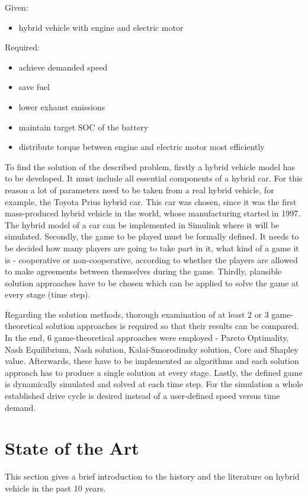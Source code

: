 Given:
\begin{itemize}
\item hybrid vehicle with engine and electric motor
\end{itemize}

Required: 
\begin{itemize}
\item achieve demanded speed
\item save fuel
\item lower exhaust emissions
\item maintain target SOC of the battery
\item distribute torque between engine and electric motor most efficiently
\end{itemize}

To find the solution of the described problem, firstly a hybrid vehicle model has to be developed. It must include all essential components of a hybrid car. For this reason a lot of parameters need to be taken from a real hybrid vehicle, for example, the Toyota Prius hybrid car. This car was chosen, since it was the first mass-produced hybrid vehicle in the world, whose manufacturing started in 1997. The hybrid model of a car can be implemented in Simulink where it will be simulated. Secondly, the game to be played must be formally defined. It needs to be decided how many players are going to take part in it, what kind of a game it is - cooperative or non-cooperative, according to whether the players are allowed to make agreements between themselves during the game. Thirdly, plausible solution approaches have to be chosen which can be applied to solve the game at every stage (time step). 

Regarding the solution methods, thorough examination of at least 2 or 3 game-theoretical solution approaches is required so that their results can be compared. In the end, 6 game-theoretical approaches were employed - Pareto Optimality, Nash Equilibrium, Nash solution, Kalai-Smorodinsky solution, Core and Shapley value. Afterwards, these have to be implemented as algorithms and each solution approach has to produce a single solution at every stage. Lastly, the defined game is dynamically simulated and solved at each time step. For the simulation a whole established drive cycle is desired instead of a user-defined speed versus time demand.


\section{State of the Art} 
\label{sec:stateart}
This section gives a brief introduction to the history and the literature on hybrid vehicle in the past 10 years.

